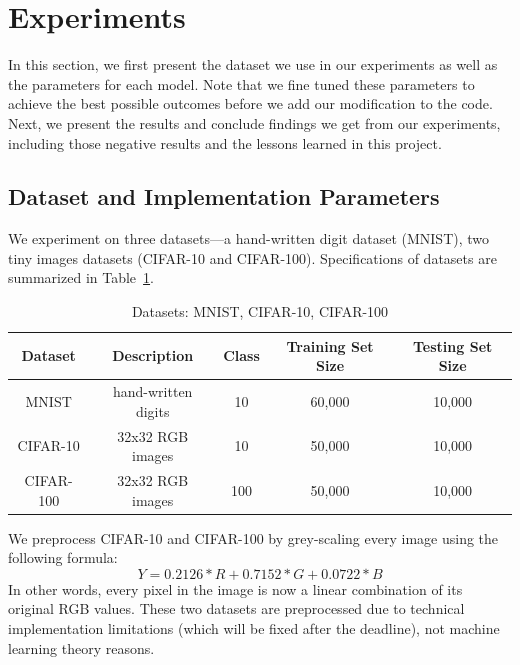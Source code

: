 \section{Experiments}
\label{sec:experiments}

In this section, we first present the dataset we use in our experiments as well
as the parameters for each model. Note that we fine tuned these parameters to
achieve the best possible outcomes before we add our modification to the code.
Next, we present the results and conclude findings we get from our experiments,
including those negative results and the lessons learned in this project.

\subsection{Dataset and Implementation Parameters}
We experiment on three datasets---a hand-written digit dataset (MNIST),
two tiny images datasets (CIFAR-10 and CIFAR-100).
Specifications of datasets are summarized in Table~\ref{datasets}.
\vspace{-7pt}
\begin{table}[!htbp]
\centering
\begin{tabular}{| c | c | c | c | c |}
\hline
Dataset & Description & Class & Training Set Size & Testing Set Size \\
\hline
MNIST & hand-written digits & 10 & 60,000 & 10,000\\
CIFAR-10 & 32x32 RGB images & 10 & 50,000 & 10,000\\
CIFAR-100 & 32x32 RGB images & 100 & 50,000 & 10,000\\
\hline
\end{tabular}
\caption{Datasets: MNIST, CIFAR-10, CIFAR-100}
\label{datasets}
\end{table}

We preprocess CIFAR-10 and CIFAR-100 by grey-scaling every image using the following formula:
\[
Y = 0.2126 * R + 0.7152 * G + 0.0722 * B
\]
In other words, every pixel in the image is now a linear combination of its
original RGB values. These two datasets are preprocessed due to technical
implementation limitations (which will be fixed after the deadline), not
machine learning theory reasons.

